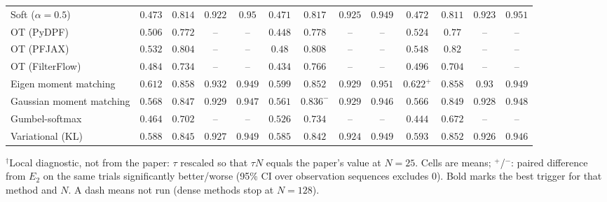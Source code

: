 \begin{table}[ht]
\begin{adjustbox}{max width=\linewidth}
\begin{tabular}{lcccc|cccc|cccc}
Soft ($\alpha{=}0.5$) & $\mathbf{0.473}$ & $0.814$ & $0.922$ & $\mathbf{0.95}$ & $0.471$ & $\mathbf{0.817}$ & $\mathbf{0.925}$ & $0.949$ & $0.472$ & $0.811$ & $0.923$ & $0.951$ \\
OT (PyDPF) & $0.506$ & $0.772$ & -- & -- & $0.448$ & $\mathbf{0.778}$ & -- & -- & $\mathbf{0.524}$ & $0.77$ & -- & -- \\
OT (PFJAX) & $0.532$ & $0.804$ & -- & -- & $0.48$ & $0.808$ & -- & -- & $\mathbf{0.548}$ & $\mathbf{0.82}$ & -- & -- \\
OT (FilterFlow) & $0.484$ & $0.734$ & -- & -- & $0.434$ & $\mathbf{0.766}$ & -- & -- & $\mathbf{0.496}$ & $0.704$ & -- & -- \\
Eigen moment matching & $0.612$ & $\mathbf{0.858}$ & $\mathbf{0.932}$ & $0.949$ & $0.599$ & $0.852$ & $0.929$ & $\mathbf{0.951}$ & $\mathbf{0.622}^{+}$ & $\mathbf{0.858}$ & $0.93$ & $0.949$ \\
Gaussian moment matching & $\mathbf{0.568}$ & $0.847$ & $\mathbf{0.929}$ & $0.947$ & $0.561$ & $0.836^{-}$ & $0.929$ & $0.946$ & $0.566$ & $\mathbf{0.849}$ & $0.928$ & $\mathbf{0.948}$ \\
Gumbel-softmax & $0.464$ & $0.702$ & -- & -- & $\mathbf{0.526}$ & $\mathbf{0.734}$ & -- & -- & $0.444$ & $0.672$ & -- & -- \\
Variational (KL) & $0.588$ & $0.845$ & $\mathbf{0.927}$ & $\mathbf{0.949}$ & $0.585$ & $0.842$ & $0.924$ & $0.949$ & $\mathbf{0.593}$ & $\mathbf{0.852}$ & $0.926$ & $0.946$ \\
\bottomrule
\end{tabular}
\end{adjustbox}
\par\smallskip\parbox{0.95\linewidth}{\footnotesize $^\dagger$Local diagnostic, not from the paper: $\tau$ rescaled so that $\tau N$ equals the paper's value at $N{=}25$. Cells are means; $^{+}$/$^{-}$: paired difference from $E_2$ on the same trials significantly better/worse (95\% CI over observation sequences excludes 0). Bold marks the best trigger for that method and $N$. A dash means not run (dense methods stop at $N{=}128$).}
\end{table}

